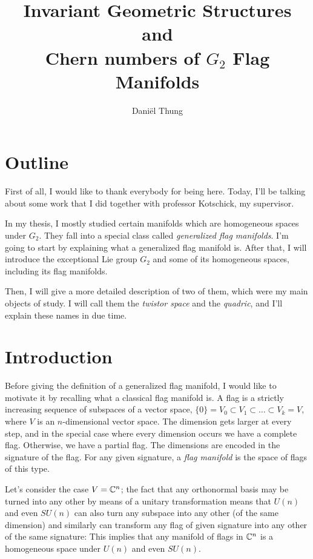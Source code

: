 \documentclass[parskip=half]{scrartcl}
\title{Invariant Geometric Structures and \\ Chern numbers of  $G_2$ Flag Manifolds}
\author{Dani\"el Thung}
\date{}
\begin{document}
\maketitle

\section{Outline}

First of all, I would like to thank everybody for being here. Today, I'll be talking about some work that I did together with professor Kotschick, my supervisor.

In my thesis, I mostly studied certain manifolds which are homogeneous spaces under $G_2$. They fall into a special class called \emph{generalized flag manifolds}. I'm going to start by explaining what a generalized flag manifold is. After that, I will introduce the exceptional Lie group $G_2$ and some of its homogeneous spaces, including its flag manifolds.

Then, I will give a more detailed description of two of them, which were my main objects of study. I will call them the \emph{twistor space} and the \emph{quadric}, and I'll explain these names in due time.

\section{Introduction}

Before giving the definition of a generalized flag manifold, I would like to motivate it by recalling what a classical flag manifold is. A flag is a strictly increasing sequence of subspaces of a vector space, $\{0\}=V_0\subset V_1\subset \dots \subset V_k=V$, where $V$ is an $n$-dimensional vector space. The dimension gets larger at every step, and in the special case where every dimension occurs we have a complete flag. Otherwise, we have a partial flag. The dimensions are encoded in the signature of the flag. For any given signature, a \emph{flag manifold} is the space of flags of this type.

Let's consider the case $V=\mathbb{C}^n$; the fact that any orthonormal basis may be turned into any other by means of a unitary transformation means that $U(n)$ and even $SU(n)$ can also turn any subspace into any other (of the same dimension) and similarly can transform any flag of given signature into any other of the same signature: This implies that any manifold of flags in $\mathbb{C}^n$ is a homogeneous space under $U(n)$ and even $SU(n)$. 
\end{document}
